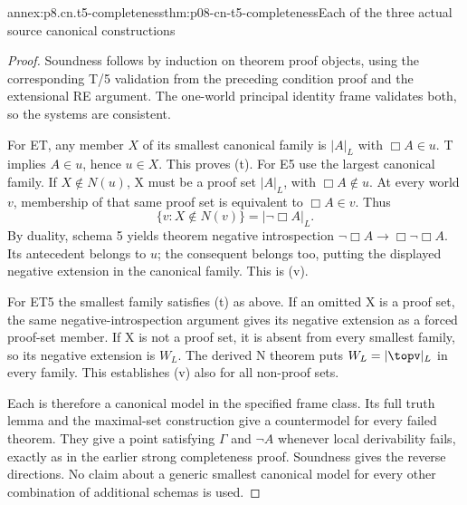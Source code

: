 \begin{annexitem}{annex:p8.cn.t5-completeness}{thm:p08-cn-t5-completeness}{Each of the three actual source canonical constructions}
\begin{proof}
Soundness follows by induction on theorem proof objects, using
the corresponding T/5 validation from the preceding condition
proof and the extensional RE argument. The one-world principal
identity frame validates both, so the systems are consistent.

For ET, any member \(X\) of its smallest canonical family
is \(|A|_L\) with \(\Box A\in u\). T implies
\(A\in u\), hence \(u\in X\). This proves (t).
For E5 use the largest canonical family. If \(X\notin N(u)\),
X must be a proof set \(|A|_L\), with \(\Box A\notin u\).
At every world \(v\), membership of that same proof set is
equivalent to \(\Box A\in v\). Thus
\[
                 \{v:X\notin N(v)\}=|\neg\Box A|_L.
\]
By duality, schema 5 yields theorem negative introspection
\(\neg\Box A\to\Box\neg\Box A\). Its antecedent
belongs to \(u\); the consequent belongs too, putting the
displayed negative extension in the canonical family. This is (v).

For ET5 the smallest family satisfies (t) as above. If an
omitted X is a proof set, the same negative-introspection
argument gives its negative extension as a forced proof-set
member. If X is not a proof set, it is absent from every
smallest family, so its negative extension is \(W_L\).
The derived N theorem puts \(W_L=|\topv|_L\) in every
family. This establishes (v) also for all non-proof sets.

Each is therefore a canonical model in the specified frame
class. Its full truth lemma and the maximal-set construction
give a countermodel for every failed theorem. They give a
point satisfying \(\Gamma\) and \(\neg A\) whenever
local derivability fails, exactly as in the earlier strong
completeness proof. Soundness gives the reverse directions.
No claim about a generic smallest canonical model for every
other combination of additional schemas is used.
\end{proof}
\end{annexitem}

